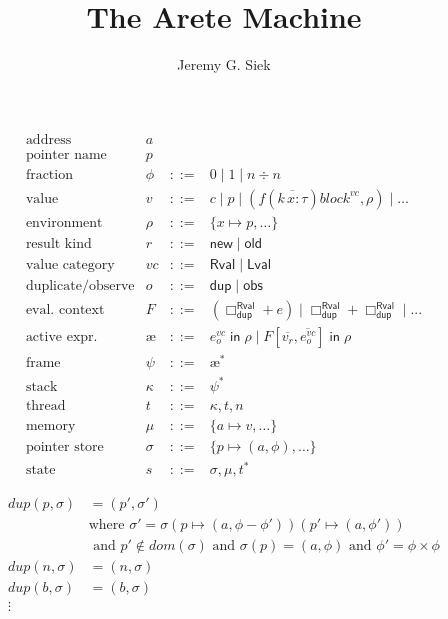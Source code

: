 \documentclass{article}
\title{The Arete Machine}
\author{Jeremy G. Siek}
\newcommand{\IN}{\mathop{\mathsf{in}}}
\newcommand{\RVAL}{\mathsf{Rval}}
\newcommand{\LVAL}{\mathsf{Lval}}
\newcommand{\DUP}{\mathsf{dup}}
\newcommand{\OBS}{\mathsf{obs}}
\newcommand{\INCTX}[4]{\boxed{#1}^{#2}_{#3} \IN #4}
\newcommand{\act}{\text{\ae}}
\begin{document}
\maketitle

\[
\begin{array}{lrcl}
  \text{address} & a \\
  \text{pointer name} & p \\
  \text{fraction} & \phi & ::= & 0 \mid 1 \mid n \div n \\
  \text{value}& v & ::= & c \mid p \mid
     (f(\overline{k\, x : \tau}) \mathit{block}^{\mathit{vc}}, \rho) \mid \ldots \\
  \text{environment} & \rho & ::= & \{ x \mapsto p, \ldots \} \\
  \text{result kind} & r & ::= & \mathsf{new} \mid \mathsf{old} \\
  \text{value category} & \mathit{vc} & ::= & \RVAL \mid \LVAL \\
  \text{duplicate/observe} & o & ::= & \DUP \mid \OBS \\
  \text{eval. context} & F & ::= & (\Box^\RVAL_\DUP + e) \mid \Box^\RVAL_\DUP + \Box^\RVAL_\DUP \mid ... \\
  \text{active expr.}& \act & ::= & \INCTX{e}{\mathit{vc}}{o}{\rho} \mid F[\overline{v_r},\overline{e^\mathit{vc}_o}] \IN \rho \\
  \text{frame}& \psi & ::= & \act^{*} \\
  \text{stack}& \kappa & ::= & \psi^{*} \\
  \text{thread}& t & ::= & \kappa, t, n \\
  \text{memory}& \mu & ::= & \{ a \mapsto v, \ldots \} \\
  \text{pointer store} & \sigma & ::= & \{ p \mapsto (a, \phi), \ldots \} \\
  \text{state}& s & ::= & \sigma, \mu, t^{*}
\end{array}
\]

\begin{align*}
  \mathit{dup}(p,\sigma) &= (p', \sigma') \\
  & \text{where } \sigma' = \sigma(p \mapsto (a,\phi - \phi'))(p'\mapsto (a,\phi')) \\
    & \text{ and } p' \notin \mathit{dom}(\sigma) \text{ and }
         \sigma(p) = (a,\phi) \text{ and } \phi' = \phi \times \phi \\
  \mathit{dup}(n,\sigma) &= (n,\sigma) \\
  \mathit{dup}(b,\sigma) &= (b,\sigma) \\
   \vdots
\end{align*}
\end{document}
